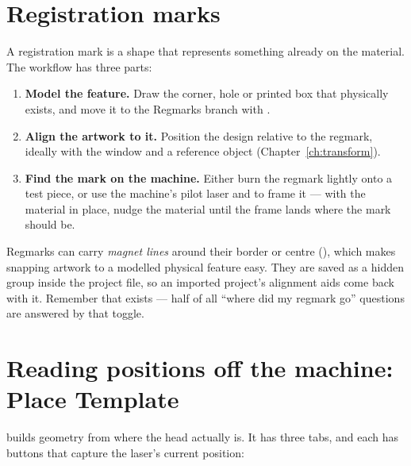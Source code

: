 \section{Registration marks}

A registration mark is a shape that represents something already on the material.
The workflow has three parts:

\begin{enumerate}[leftmargin=1.6em]
  \item \textbf{Model the feature.} Draw the corner, hole or printed box that
        physically exists, and move it to the Regmarks branch with
        .
  \item \textbf{Align the artwork to it.} Position the design relative to the
        regmark, ideally with the  window and a reference object
        (Chapter~\ref{ch:transform}).
  \item \textbf{Find the mark on the machine.} Either burn the regmark lightly
        onto a test piece, or use the machine's pilot laser and  to
        frame it --- with the material in place, nudge the material until the
        frame lands where the mark should be.
\end{enumerate}

\noindent Regmarks can carry \emph{magnet lines} around their border or centre
(), which makes snapping artwork to a modelled physical
feature easy. They are saved as a hidden group inside the project file, so an
imported project's alignment aids come back with it. Remember that
 exists --- half of all ``where did my
regmark go'' questions are answered by that toggle.

\section{Reading positions off the machine: Place Template}

 builds geometry from where the head
actually is. It has three tabs, and each has  buttons that
capture the laser's current position:

